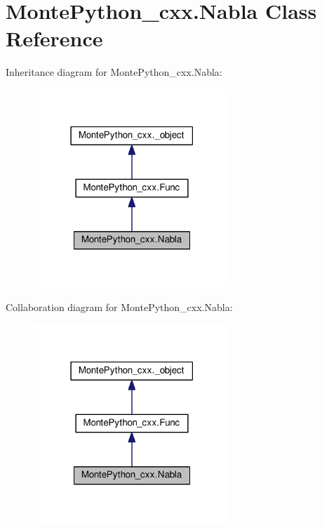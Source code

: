 \hypertarget{classMontePython__cxx_1_1Nabla}{}\section{Monte\+Python\+\_\+cxx.\+Nabla Class Reference}
\label{classMontePython__cxx_1_1Nabla}


Inheritance diagram for Monte\+Python\+\_\+cxx.\+Nabla\+:
\nopagebreak
\begin{figure}[H]
\begin{center}
\leavevmode
\includegraphics[width=210pt]{classMontePython__cxx_1_1Nabla__inherit__graph}
\end{center}
\end{figure}


Collaboration diagram for Monte\+Python\+\_\+cxx.\+Nabla\+:
\nopagebreak
\begin{figure}[H]
\begin{center}
\leavevmode
\includegraphics[width=210pt]{classMontePython__cxx_1_1Nabla__coll__graph}
\end{center}
\end{figure}
